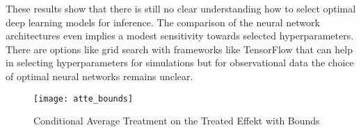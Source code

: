 These results show that there is still no clear understanding how to select optimal deep learning models for inference.
The comparison of the neural network architectures even implies a modest sensitivity towards selected hyperparameters.
There are options like grid search with frameworks like TensorFlow\textsuperscript{\textregistered} that can help in selecting hyperparameters for simulations but for observational data the choice of optimal neural networks remains unclear.
\\
\begin{figure}[h]
\centering
\caption{Conditional Average Treatment on the Treated Effekt with Bounds}
\texttt{[image: atte\_bounds]}
\label{fig:atte_bounds}
\end{figure}
